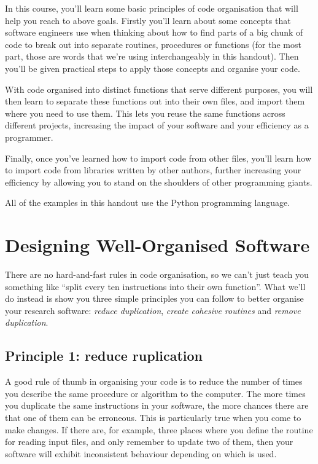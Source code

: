 \documentclass[a4paper]{article}
\begin{document}
In this course, you'll learn some basic principles of code organisation that will help you reach to above goals.
Firstly you'll learn about some concepts that software engineers use when thinking about how to find parts of a big chunk of code to break out into separate routines, procedures or functions (for the most part, those are words that we're using interchangeably in this handout).
Then you'll be given practical steps to apply those concepts and organise your code.

With code organised into distinct functions that serve different purposes, you will then learn to separate these functions out into their own files, and import them where you need to use them.
This lets you reuse the same functions across different projects, increasing the impact of your software and your efficiency as a programmer.

Finally, once you've learned how to import code from other files, you'll learn how to import code from libraries written by other authors, further increasing your efficiency by allowing you to stand on the shoulders of other programming giants.

All of the examples in this handout use the Python programming language.

\section{Designing Well-Organised Software}

There are no hard-and-fast rules in code organisation, so we can't just teach you something like ``split every ten instructions into their own function''.
What we'll do instead is show you three simple principles you can follow to better organise your research software: \textit{reduce duplication}, \textit{create cohesive routines} and \textit{remove duplication}.

\subsection{Principle 1: reduce ruplication}

A good rule of thumb in organising your code is to reduce the number of times you describe the same procedure or algorithm to the computer.
The more times you duplicate the same instructions in your software, the more chances there are that one of them can be erroneous.
This is particularly true when you come to make changes.
If there are, for example, three places where you define the routine for reading input files, and only remember to update two of them, then your software will exhibit inconsistent behaviour depending on which is used.
\end{document}

